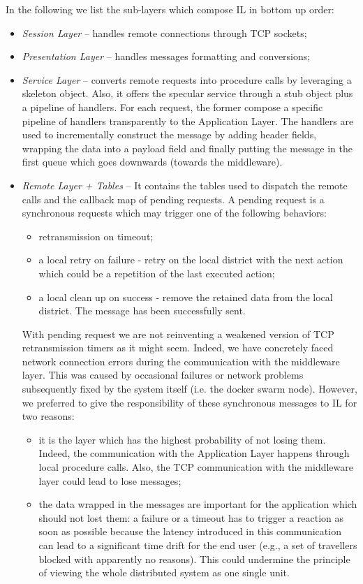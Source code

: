 In the following we list the sub-layers which compose IL in
bottom up order:

\begin{itemize}
  \item \textit{Session Layer} --
  handles remote connections through TCP sockets;
  \item \textit{Presentation Layer} --
  handles messages formatting and conversions;
  \item \textit{Service Layer} --
  converts remote requests into procedure calls
  by leveraging a skeleton object.
  Also, it offers the specular service through a stub object plus a pipeline
  of handlers. For each request, the former compose a specific pipeline
  of handlers transparently to the Application Layer.
  The handlers are used to incrementally construct the message by adding
  header fields, wrapping the data into a payload field and finally putting
  the message in the first queue which goes downwards (towards the middleware).
  \item \textit{Remote Layer + Tables} --
  It contains the tables used
  to dispatch the remote calls and the callback map of pending requests.
  A pending request is a synchronous requests which may trigger one of
  the following behaviors:
  \begin{itemize}
  	\item retransmission on timeout;
  	\item a local retry on failure - retry on the local district with
  	the next action which could be a repetition of the last executed action;
  	\item a local clean up on success - remove the retained data from the local
  	district. The message has been successfully sent.
  \end{itemize}
  With pending request we are not reinventing a weakened version
  of TCP retransmission timers as it might seem.
  Indeed, we have concretely faced network connection errors during
  the communication
  with the middleware layer. This was caused by occasional failures or network
  problems subsequently fixed by the system itself (i.e. the docker swarm node).
  However,
  we preferred to give the responsibility of these synchronous messages to IL
  for two reasons:
  \begin{itemize}
  	\item it is the layer which has the highest probability of not losing them.
  	Indeed, the communication with the Application Layer happens through
  	local procedure
  	calls. Also, the TCP communication with the middleware layer could lead to
  	lose messages;
  	\item the data wrapped in the messages are important for the
  	application which should not lost them: a failure
  	or a timeout has to trigger a reaction as soon as possible because
  	the latency introduced in this communication can lead to a significant
  	time drift for the end user (e.g., a set of travellers blocked with
  	apparently no reasons). This could undermine the principle of viewing the
  	whole distributed system as one single unit.
  \end{itemize}
\end{itemize}